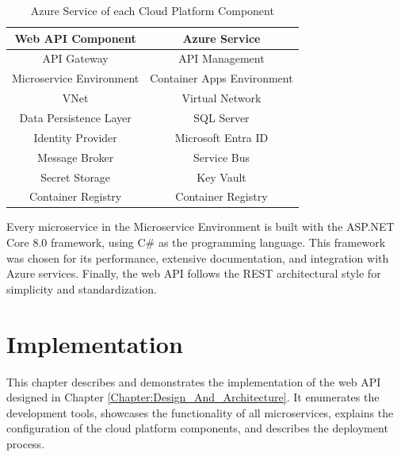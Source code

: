 \documentclass[12pt, reqno]{amsbook}
\theoremstyle{definition}
\theoremstyle{definition}
\numberwithin{section}{chapter}
\numberwithin{table}{chapter}
\numberwithin{figure}{chapter}
\begin{document}
\begin{table}[h!]
  \centering
  \begin{tabular}{|c|c|}
    \hline
    \multicolumn{1}{|c|}{\textbf{Web \ac{API} Component}} & \multicolumn{1}{c|}{\textbf{Azure Service}} \\
    \hline
    \ac{API} Gateway                                      & API Management                              \\
    \hline
    Microservice Environment                              & Container Apps Environment                  \\
    \hline
    \ac{VNet}                                             & Virtual Network                             \\
    \hline
    Data Persistence Layer                                & SQL Server                                  \\
    \hline
    Identity Provider                                     & Microsoft Entra ID                          \\
    \hline
    Message Broker                                        & Service Bus                                 \\
    \hline
    Secret Storage                                        & Key Vault                                   \\
    \hline
    Container Registry                                    & Container Registry                          \\
    \hline
  \end{tabular}
  \vspace{10pt}
  \caption{Azure Service of each Cloud Platform Component}
  \label{Table:AzureServiceMapping}
\end{table}

Every microservice in the Microservice Environment is built with the ASP.NET Core 8.0 framework, using C\# as the programming language. This framework was chosen for its performance, extensive documentation, and integration with Azure services. Finally, the web \ac{API} follows the \ac{REST} architectural style for simplicity and standardization.

\chapter{Implementation}
\label{Chapter:Implementation}

This chapter describes and demonstrates the implementation of the web \ac{API} designed in Chapter \ref{Chapter:Design_And_Architecture}. It enumerates the development tools, showcases the functionality of all microservices, explains the configuration of the cloud platform components, and describes the deployment process.
\end{document}
